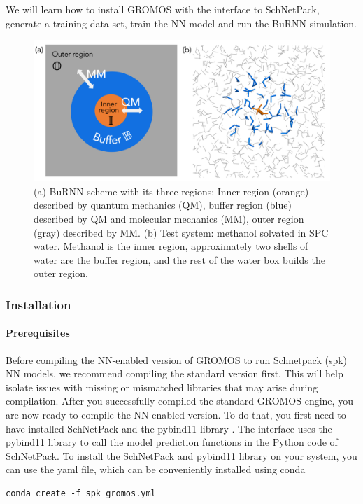 We will learn how to install GROMOS with the interface to SchNetPack, generate a training data set, train the NN model and run the BuRNN simulation.


\begin{figure}[H]
\centering
\includegraphics[scale=.33]{../09_tutorial_06/figures/BuRNN_scheme}
\caption{(a) BuRNN scheme with its three regions: Inner region (orange) described by quantum mechanics (QM), buffer region (blue) described by QM and molecular mechanics (MM), outer region (gray) described by MM. (b) Test system: methanol solvated in SPC water. Methanol is the inner region, approximately two shells of water are the buffer region, and the rest of the water box builds the outer region.}
\label{BuRNN_scheme}
\end{figure}


\subsubsection{Installation} \label{chap:burnn_install}
\paragraph{Prerequisites}
Before compiling the NN-enabled version of GROMOS to run Schnetpack (spk) NN models, we recommend compiling the standard version first. This will help isolate issues with missing or mismatched libraries that may arise during compilation.
After you successfully compiled the standard GROMOS engine, you are now ready to compile the NN-enabled version. To do that, you first need to have installed SchNetPack and the pybind11 library \cite{pybind11}. The interface uses the pybind11 library to call the model prediction functions in the Python code of SchNetPack. To install the SchNetPack and pybind11 library on your system, you can use the yaml file, which can be conveniently installed using conda \cite{anaconda}
\begin{lstlisting}[breaklines=true, breakatwhitespace=false]
    conda create -f spk_gromos.yml
\end{lstlisting}

